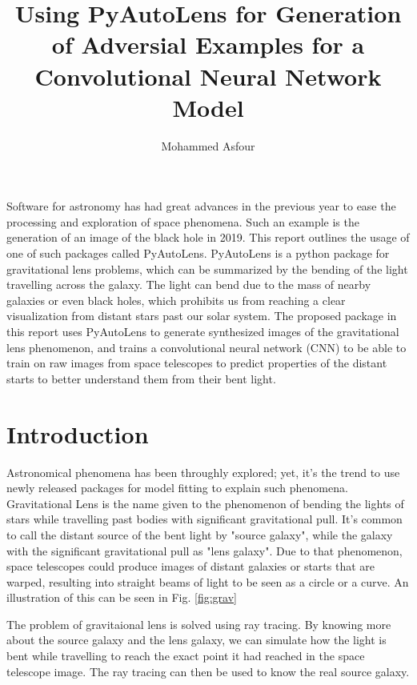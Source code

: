 \documentclass[12pt]{article}
\title{Using PyAutoLens for Generation of Adversial Examples for a Convolutional Neural Network Model}
\author{Mohammed Asfour}
\begin{document}
\maketitle

\abstract%
Software for astronomy has had great advances in the previous year to ease the processing and exploration of space phenomena. Such an example is the generation of an image of the black hole in 2019. This report outlines the usage of one of such packages called PyAutoLens. PyAutoLens is a python package for gravitational lens problems, which can be summarized by the bending of the light travelling across the galaxy. The light can bend due to the mass of nearby galaxies or even black holes, which prohibits us from reaching a clear visualization from distant stars past our solar system. The proposed package in this report uses PyAutoLens to generate synthesized images of the gravitational lens phenomenon, and trains a convolutional neural network (CNN) to be able to train on raw images from space telescopes to predict properties of the distant starts to better understand them from their bent light.

\section{Introduction}
Astronomical phenomena has been throughly explored\cite{astro5}\cite{astro3}\cite{astro4}; yet, it's the trend to use newly released packages for model fitting to explain such phenomena\cite{astro1}\cite{astro2}.
Gravitational Lens is the name given to the phenomenon of bending the lights of stars while travelling past bodies with significant gravitational pull. It's common to call the distant source of the bent light by "source galaxy", while the galaxy with the significant gravitational pull as "lens galaxy". Due to that phenomenon, space telescopes could produce images of distant galaxies or starts that are warped, resulting into straight beams of light to be seen as a circle or a curve. An illustration of this can be seen in Fig. \ref{fig:grav}

The problem of gravitaional lens is solved using ray tracing. By knowing more about the source galaxy and the lens galaxy, we can simulate how the light is bent while travelling to reach the exact point it had reached in the space telescope image. The ray tracing can then be used to know the real source galaxy.
\end{document}

